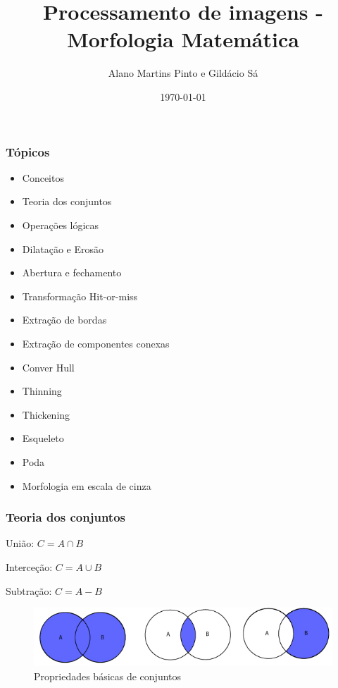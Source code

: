 \documentclass[aspectratio=169]{beamer}
\title[\sc{Processamento de imagens}]{Processamento de imagens - Morfologia Matemática}
\author[Alano Martins Pinto]{Alano Martins Pinto e Gildácio Sá}
\institute{UECE - Universidade Estadual do Ceará} %
\date{\today}
\theoremstyle{Definition}
\begin{document}
\begin{frame}
	\titlepage
\end{frame}


\begin{frame}
	\frametitle{Tópicos}
	\begin{itemize}
		\item Conceitos
		\item Teoria dos conjuntos
		\item Operações lógicas
		\item Dilatação e Erosão
		\item Abertura e fechamento
		\item Transformação Hit-or-miss
		\item Extração de bordas
		\item Extração de componentes conexas
		\item Conver Hull
		\item Thinning
		\item Thickening
		\item Esqueleto
		\item Poda
		\item Morfologia em escala de cinza
	\end{itemize}

\end{frame}


\begin{frame}\frametitle{Teoria dos conjuntos}

União: $C = A \cap B $ 

Interceção: $C = A \cup B $ 

Subtração: $C = A - B $ 


  \begin{figure}[h]
    \centering
    \includegraphics[height=0.3\paperheight]{imagens/basic_sets}
    \caption{Propriedades básicas de conjuntos}\label{figConjuntos}
  \end{figure}

\end{frame}
\end{document}
